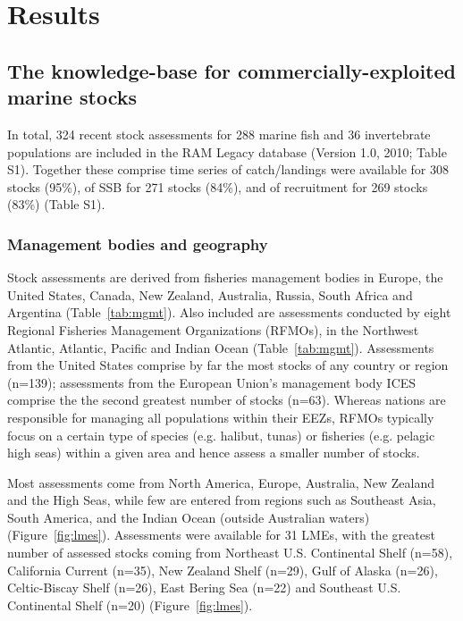 \newpage
\section*{Results}
\subsection*{The knowledge-base for commercially-exploited marine stocks}
In total, 324 recent stock assessments for
288 marine fish and 36
invertebrate populations are included in the RAM Legacy database
(Version 1.0, 2010; Table S1). Together these comprise time series of
catch/landings were available for 308 stocks (95\%),
of SSB for 271 stocks (84\%), and of recruitment for
269 stocks (83\%) (Table S1).

\subsubsection*{Management bodies and geography}
Stock assessments are derived from fisheries management bodies
in Europe, the United States, Canada, New Zealand, Australia, Russia,
South Africa and Argentina (Table~\ref{tab:mgmt}). Also included are assessments
conducted by eight Regional Fisheries Management Organizations
(RFMOs), in the Northwest Atlantic, Atlantic, Pacific and Indian Ocean
(Table~\ref{tab:mgmt}). Assessments from the United States comprise by far the most
stocks of any country or region (n=139);
assessments from the European Union's management body ICES comprise
the the second greatest number of stocks (n=63).
Whereas nations are responsible for managing all populations within
their EEZs, RFMOs typically focus on a certain type of species (e.g.
halibut, tunas) or fisheries (e.g. pelagic high seas) within a given
area and hence assess a smaller number of stocks.

Most assessments come from North America, Europe, Australia, New
Zealand and the High Seas, while few are entered from regions such as
Southeast Asia, South America, and the Indian Ocean (outside
Australian waters) (Figure~\ref{fig:lmes}). Assessments were available for 31 LMEs, with the greatest number of
assessed stocks coming from Northeast U.S. Continental Shelf (n=58),
California Current (n=35), New Zealand Shelf (n=29),
Gulf of Alaska (n=26), Celtic-Biscay Shelf (n=26), East Bering Sea (n=22)
and Southeast U.S. Continental Shelf (n=20) (Figure~\ref{fig:lmes}).

